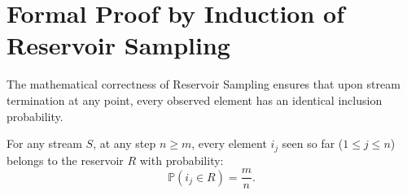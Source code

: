 \FloatBarrier
\section{Formal Proof by Induction of Reservoir Sampling}
\label{sec:reservoir-sampling-proof}

The mathematical correctness of Reservoir Sampling ensures that upon stream termination at any point, every observed element has an identical inclusion probability.

\begin{theorem}
For any stream $S$, at any step $n \ge m$, every element $i_j$ seen so far ($1 \le j \le n$) belongs to the reservoir $R$ with probability:
\begin{equation}
  \mathbb{P}(i_j \in R) = \frac{m}{n}.
\end{equation}
\end{theorem}

